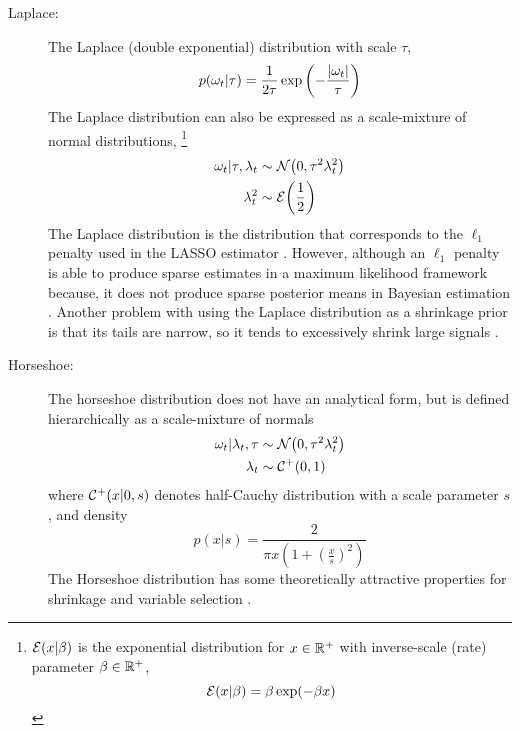 \documentclass[12pt]{article}
\begin{document}
\begin{description}
\item[Laplace:] The Laplace (double exponential) distribution with scale $\tau$,
\begin{equation}
  \label{dlm:eq:14}
  p(\omega_{t}| \tau) = \frac{1}{2 \tau} \exp
  \left(
    - \frac{\lvert\omega_{t}\rvert}{\tau}
  \right)
\end{equation}
The Laplace distribution can also be expressed as a scale-mixture of normal distributions,%
\footnote{
  $\mathcal{E}\mathopen{}\left(x | \beta\right)\mathclose{}$ is the exponential distribution for $x \in \mathbb{R}^{+}$ with inverse-scale (rate) parameter $\beta \in \mathbb{R}^{+}$,
    \begin{equation}
      \label{dlm:eq:13}
      \mathcal{E}\mathopen{}\left(x | \beta\right)\mathclose{} = \beta \exp(- \beta x)
    \end{equation}
}
\begin{equation}
  \label{dlm:eq:12}
  \begin{aligned}[t]
  \omega_{t} | \tau, \lambda_{t} &\sim \mathcal{N}\mathopen{}\left(0, \tau^{2} \lambda_{t}^{2}\right)\mathclose{} \\
  \lambda_{t}^{2} & \sim \mathcal{E}\mathopen{}\left(\frac{1}{2}\right)\mathclose{}
  \end{aligned}
\end{equation}
The Laplace distribution is the distribution that corresponds to the $\ell_{1}$ penalty used in the LASSO estimator \parencites{ParkCasella2008}{Hans2009}.
However, although an $\ell_{1}$ penalty is able to produce sparse estimates in a maximum likelihood framework because, it does not produce sparse posterior means in Bayesian estimation \parencites{ParkCasella2008}.
Another problem with using the Laplace distribution as a shrinkage prior is that its tails are narrow, so it tends to excessively shrink large signals \parencites{CarvalhoPolsonScott2010}.

\item[Horseshoe:] The horseshoe distribution \parencites{CarvalhoPolsonScott2009}{CarvalhoPolsonScott2010} does not have an analytical form, but is defined hierarchically as a scale-mixture of normals
\begin{equation}
  \label{dlm:eq:7}
  \begin{aligned}[t]
    \omega_{t} | \lambda_{t}, \tau & \sim \mathcal{N}\mathopen{}\left(0, \tau^{2} \lambda_{t}^{2}\right)\mathclose{} \\
    \lambda_{t}  & \sim \mathcal{C^+}\mathopen{}\left(0, 1\right)\mathclose{}
  \end{aligned}
\end{equation}
where $\mathcal{C^+}\mathopen{}\left(x | 0, s\right)\mathclose{}$ denotes half-Cauchy distribution with a scale parameter $s$, and density
\begin{equation}
  \label{dlm:eq:8}
  p(x | s) = \frac{2}{\pi x \left(1 + {\left(\frac{x}{s}\right)}^{2}\right)}
\end{equation}
The Horseshoe distribution has some theoretically attractive properties for shrinkage and variable selection \parencites{CarvalhoPolsonScott2009}{CarvalhoPolsonScott2010}{DattaGhosh2012}{PasKleijnVaart2014a}.


\end{description}
\end{document}

